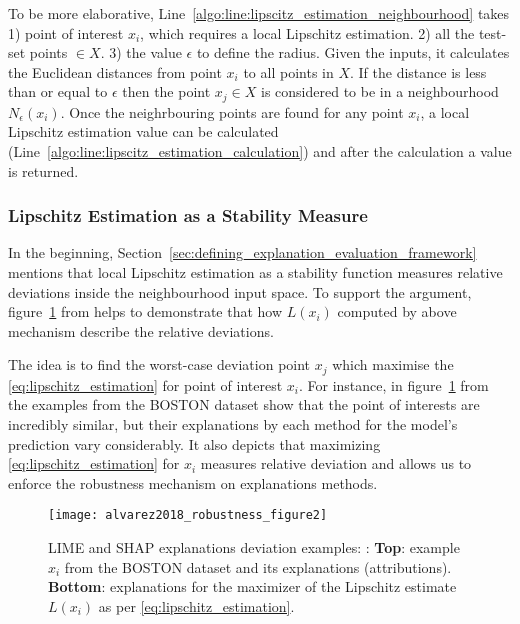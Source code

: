\documentclass[english]{tktltiki2}
\theoremstyle{definition}
\theoremstyle{remark}
\begin{document}
To be more elaborative, Line~\ref{algo:line:lipscitz_estimation_neighbourhood}
takes 1)  point of interest $x_i$, which requires a local Lipschitz estimation. 2) all the test-set points $ \in X$. 3) the value $\epsilon$ to define the radius. Given the inputs, it calculates the Euclidean distances from point $x_i$ to all points in $X$. If the distance is less than or equal to $\epsilon$ then the point $x_j \in X$ is considered to be in a neighbourhood $N_{\epsilon}(x_i)$. Once the neighrbouring points are found for any point $x_i$, a local Lipschitz estimation value can be calculated (Line~\ref{algo:line:lipscitz_estimation_calculation}) and after the calculation a value is returned.

\subsubsection{Lipschitz Estimation as a Stability Measure}\label{sec:lipschitz_estimation_as_a_stability_measure} %
In the beginning, Section~\ref{sec:defining_explanation_evaluation_framework} mentions that local Lipschitz estimation as a stability function measures relative deviations inside the neighbourhood input space. To support the argument, figure~\ref{fig:alvarez2018_robustness_figure2} from \citep{alvarez2018robustness} helps to demonstrate that how $L(x_i)$ computed by above mechanism describe the relative deviations.

The idea is to find the worst-case deviation point $x_j$ which maximise the \eqref{eq:lipschitz_estimation} for point of interest $x_i$. For instance, in figure~\ref{fig:alvarez2018_robustness_figure2} from \citep{alvarez2018robustness} the examples from the BOSTON dataset show that the point of interests are incredibly similar, but their explanations by each method for the model’s prediction vary considerably. It also depicts that maximizing \eqref{eq:lipschitz_estimation} for $x_i$ measures relative deviation and allows us to enforce the robustness mechanism on explanations methods.
\begin{figure}[H]
	\texttt{[image: alvarez2018\_robustness\_figure2]}
	\vspace*{-10mm}
	\caption{LIME and SHAP explanations deviation examples: \citep{alvarez2018robustness}: \textbf{Top}: example $x_i$ from the BOSTON dataset and its explanations (attributions). \textbf{Bottom}: explanations for the maximizer of the Lipschitz estimate $L(x_i)$ as per \eqref{eq:lipschitz_estimation}.}
	\label{fig:alvarez2018_robustness_figure2}
\end{figure}
\end{document}
